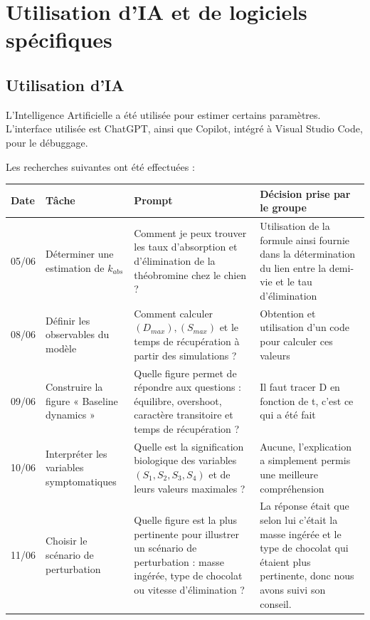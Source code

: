 \documentclass[11pt,a4paper]{article}
\begin{document}
\section{Utilisation d'IA et de logiciels spécifiques}
\label{sec:ai-software}

\subsection{Utilisation d'IA}

L'Intelligence Artificielle a été utilisée pour estimer certains paramètres. L'interface
utilisée est ChatGPT, ainsi que Copilot, intégré à Visual Studio Code, pour le débuggage.

Les recherches suivantes ont été effectuées : 

\begin{center}
\begin{tabular}{p{2cm}p{4cm}p{5cm}p{3cm}}
\toprule
\textbf{Date} & \textbf{Tâche} & \textbf{Prompt} & \textbf{Décision prise par le groupe} \\
\midrule
 05/06 & Déterminer une estimation de $k_{abs}$ 
 & Comment je peux trouver les taux d'absorption et d'élimination de la théobromine chez le chien ? 
 & Utilisation de la formule ainsi fournie dans la détermination du lien entre la demi-vie
 et le tau d'élimination \\
 08/06 & Définir les observables du modèle 
 & Comment calculer $(D_{max}), (S_{max})$ et le temps de récupération à partir des simulations ? 
 & Obtention et utilisation d'un code pour calculer ces valeurs\\
 09/06 & Construire la figure « Baseline dynamics » 
 & Quelle figure permet de répondre aux questions : équilibre, overshoot, caractère transitoire et temps de récupération ? 
 & Il faut tracer D en fonction de t, c'est ce qui a été fait\\
 10/06 & Interpréter les variables symptomatiques 
 & Quelle est la signification biologique des variables $(S_1, S_2, S_3, S_4)$ et de leurs valeurs maximales ?
 & Aucune, l'explication a simplement permis une meilleure compréhension\\
 11/06 & Choisir le scénario de perturbation
 & Quelle figure est la plus pertinente pour illustrer un scénario de perturbation : masse ingérée, type de chocolat ou vitesse d'élimination ?
 & La réponse était que selon lui c'était la masse ingérée et le type de chocolat qui étaient plus pertinente, 
 donc nous avons suivi son conseil.\\
\bottomrule
\end{tabular}
\end{center}
\end{document}
